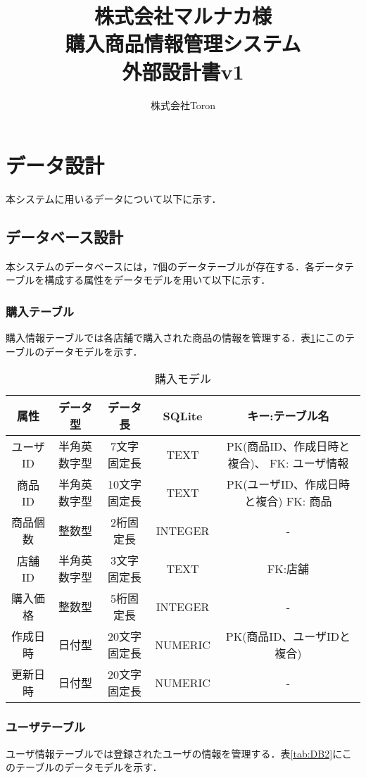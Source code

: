 \documentclass[a4j]{jarticle}
\title{
\vspace{30mm}
株式会社マルナカ様\\
購入商品情報管理システム\\
外部設計書v1
\vspace{90mm}
}
\author{
株式会社Toron
}
\begin{document}
\maketitle
\newpage
\tableofcontents
\newpage
\section{データ設計}
本システムに用いるデータについて以下に示す．
\subsection{データベース設計}
本システムのデータベースには，7個のデータテーブルが存在する．各データテーブルを構成する属性をデータモデルを用いて以下に示す．
\subsubsection{購入テーブル}
購入情報テーブルでは各店舗で購入された商品の情報を管理する．表\ref{tab:DB1}にこのテーブルのデータモデルを示す．
\begin{table}[H]
\caption{購入モデル}
\label{tab:DB1}
\begin{center}
\begin{tabular}{|c|c|c|c|c|}
\hline
属性　&データ型&データ長&SQLite&キー:テーブル名\\ \hline\hline
ユーザID &半角英数字型&7文字固定長&TEXT&PK(商品ID、作成日時と複合)、 FK: ユーザ情報 \\ \hline
商品ID &半角英数字型&10文字固定長&TEXT&PK(ユーザID、作成日時と複合) FK: 商品\\ \hline
商品個数 &整数型&2桁固定長&INTEGER&- \\ \hline
店舗ID &半角英数字型&3文字固定長&TEXT&FK:店舗 \\ \hline
購入価格&整数型&5桁固定長&INTEGER&- \\ \hline
作成日時  &日付型&20文字固定長&NUMERIC&PK(商品ID、ユーザIDと複合) \\ \hline
更新日時 &日付型&20文字固定長&NUMERIC&-  \\ \hline
\end{tabular}
\end{center}
\end{table}
\subsubsection{ユーザテーブル}
ユーザ情報テーブルでは登録されたユーザの情報を管理する．表\ref{tab:DB2}にこのテーブルのデータモデルを示す．
\end{document}
